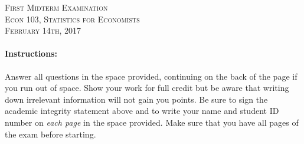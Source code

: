 \documentclass[addpoints,12pt]{exam}
\begin{document}
\begin{center}
\textsc{\large First Midterm Examination\\ \normalsize Econ 103, Statistics for Economists \\ \vspace{0.5em} February 14th, 2017}

\vspace{2em}



\end{center}


\vspace{2em}
\begin{center}
\end{center}
\vspace{0.2in}

\vspace{0.2in}

\noindent{}

\vspace{0.2in}

\noindent{}
\hfill
{}

\vspace{2em}

\begin{center}
  \gradetable[h][questions]
\end{center}

\vspace{2em}

\paragraph{Instructions:} Answer all questions in the space provided, continuing on the back of the page if you run out of space. Show your work for full credit but be aware that writing down irrelevant information will not gain you points. Be sure to sign the academic integrity statement above and to write your name and student ID number on \emph{each page} in the space provided. Make sure that you have all pages of the exam before starting.
\end{document}
